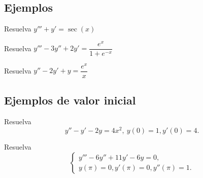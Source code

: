 \subsection{Ejemplos}


\begin{resuelto}
	\label{bron:exmp:12.1}
	Resuelva $y'''+y'=\sec(x)$
\end{resuelto}




\begin{resuelto}
	\label{bron:12.2}
	Resuelva $y'''-3y''+2y'=\dfrac{e^{x}}{1+e^{-x}}$
\end{resuelto}




\begin{resuelto}
	\label{bron:12.3}
	Resuelva $y''-2y'+y=\dfrac{e^x}{x}$
\end{resuelto}



\subsection{Ejemplos de valor inicial}


\label{bron:13.1}
\begin{resuelto}
	Resuelva
	$$
	y''-y'-2y=4x^{2}, \ y(0)=1, y'(0)=4.
	$$
\end{resuelto}




\begin{resuelto}
	\label{bron:13.4}
	Resuelva
	$$\begin{cases}
		y'''-6y''+11y'-6y=0, \\
		y(\pi)=0, y'(\pi)=0, y''(\pi)=1.
	\end{cases}
	$$
\end{resuelto}




